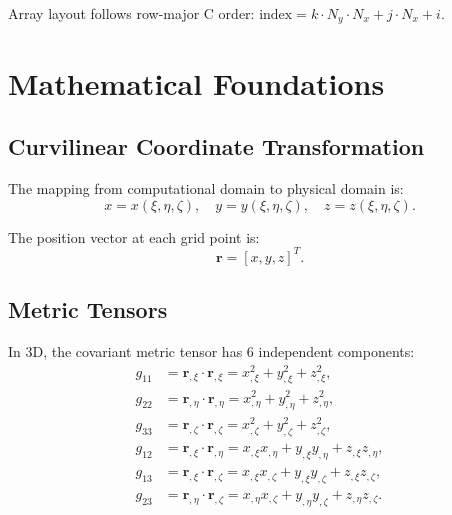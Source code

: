 \documentclass[11pt,a4paper]{report}
\newcommand{\rvec}{\bm{r}}
\begin{document}
Array layout follows row-major C order: $\text{index} = k \cdot N_y \cdot N_x + j \cdot N_x + i$.

\chapter{Mathematical Foundations}

\section{Curvilinear Coordinate Transformation}

The mapping from computational domain to physical domain is:
\begin{equation}
    x = x(\xi, \eta, \zeta), \quad y = y(\xi, \eta, \zeta), \quad z = z(\xi, \eta, \zeta).
\end{equation}

The position vector at each grid point is:
\begin{equation}
    \rvec = [x, y, z]^T.
\end{equation}

\section{Metric Tensors}

In 3D, the covariant metric tensor has 6 independent components:
\begin{equation}
\begin{aligned}
    g_{11} &= \rvec_{,\xi} \cdot \rvec_{,\xi} = x_{,\xi}^2 + y_{,\xi}^2 + z_{,\xi}^2, \\
    g_{22} &= \rvec_{,\eta} \cdot \rvec_{,\eta} = x_{,\eta}^2 + y_{,\eta}^2 + z_{,\eta}^2, \\
    g_{33} &= \rvec_{,\zeta} \cdot \rvec_{,\zeta} = x_{,\zeta}^2 + y_{,\zeta}^2 + z_{,\zeta}^2, \\
    g_{12} &= \rvec_{,\xi} \cdot \rvec_{,\eta} = x_{,\xi} x_{,\eta} + y_{,\xi} y_{,\eta} + z_{,\xi} z_{,\eta}, \\
    g_{13} &= \rvec_{,\xi} \cdot \rvec_{,\zeta} = x_{,\xi} x_{,\zeta} + y_{,\xi} y_{,\zeta} + z_{,\xi} z_{,\zeta}, \\
    g_{23} &= \rvec_{,\eta} \cdot \rvec_{,\zeta} = x_{,\eta} x_{,\zeta} + y_{,\eta} y_{,\zeta} + z_{,\eta} z_{,\zeta}.
\end{aligned}
\end{equation}
\end{document}
